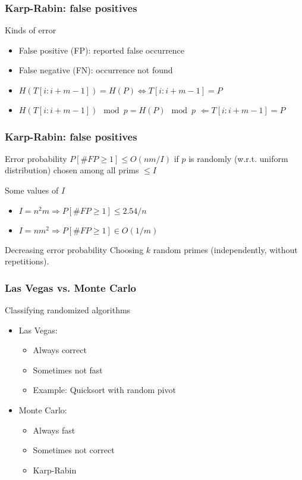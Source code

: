 \documentclass[14pt,aspectratio=169]{beamer}
\begin{document}
\begin{frame}[fragile]
\frametitle{Karp-Rabin: false positives}
\begin{block}{Kinds of error}
\begin{itemize}
\item
False positive (FP): reported false occurrence
\item
False negative (FN): occurrence not found
\item
$H(T[i:i+m-1])=H(P) \Leftrightarrow T[i:i+m-1]=P$
\item
$H(T[i:i+m-1])  \mod p = H(P)  \mod p$
$\Leftarrow T[i:i+m-1]=P$
\end{itemize}
\end{block}
\end{frame}


\begin{frame}[fragile]
\frametitle{Karp-Rabin: false positives}
\begin{block}{Error probability}
$P[\#FP\ge 1] \le O(nm/I)$ if $p$ is randomly (w.r.t. uniform distribution) chosen among
all prims $\le I$
\end{block}

\begin{block}{Some values of $I$}
\begin{itemize}
\item
$I=n^{2}m \Rightarrow P[\#FP\ge 1] \le 2.54/n$
\item
$I=nm^{2}  \Rightarrow P[\#FP\ge 1] \in O(1/m)$
\end{itemize}
\end{block}

\begin{block}{Decreasing error probability}
  Choosing $k$ random primes (independently, without repetitions).
\end{block}
\end{frame}

\begin{frame}[fragile]
\frametitle{Las Vegas vs.
  Monte Carlo}
\begin{block}{Classifying randomized algorithms}
\begin{itemize}
\item
Las Vegas:
\begin{itemize}
\item
Always correct
\item
Sometimes not fast
\item
Example: Quicksort with random pivot
\end{itemize}
\item
Monte Carlo:
\begin{itemize}
\item
Always fast
\item
Sometimes not correct
\item
Karp-Rabin
\end{itemize}
\end{itemize}
\end{block}
\end{frame}
\end{document}
